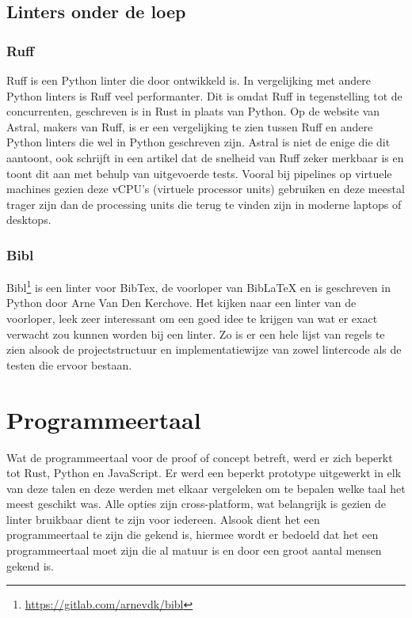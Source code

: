 \subsection{Linters onder de loep}
\subsubsection{Ruff}
Ruff is een Python linter die door \textcite{Astral2024} ontwikkeld is. In vergelijking met andere Python linters is Ruff veel performanter. Dit is omdat Ruff in tegenstelling tot de concurrenten, geschreven is in Rust in plaats van Python. Op de website van Astral, makers van Ruff, is er een vergelijking te zien tussen Ruff en andere Python linters die wel in Python geschreven zijn. Astral is niet de enige die dit aantoont, ook \textcite{TurnerTrauring2023} schrijft in een artikel dat de snelheid van Ruff zeker merkbaar is en toont dit aan met behulp van uitgevoerde tests. Vooral bij pipelines op virtuele machines gezien deze vCPU's (virtuele processor units) gebruiken en deze meestal trager zijn dan de processing units die terug te vinden zijn in moderne laptops of desktops.

\subsubsection{Bibl}
Bibl\footnote{\url{https://gitlab.com/arnevdk/bibl}} is een linter voor BibTex, de voorloper van BibLaTeX en is geschreven in Python door Arne Van Den Kerchove. Het kijken naar een linter van de voorloper, leek zeer interessant om een goed idee te krijgen van wat er exact verwacht zou kunnen worden bij een linter. Zo is er een hele lijst van regels te zien alsook de projectstructuur en implementatiewijze van zowel lintercode als de testen die ervoor bestaan.

\section{Programmeertaal}
Wat de programmeertaal voor de proof of concept betreft, werd er zich beperkt tot Rust, Python en JavaScript. Er werd een beperkt prototype uitgewerkt in elk van deze talen en deze werden met elkaar vergeleken om te bepalen welke taal het meest geschikt was. Alle opties zijn cross-platform, wat belangrijk is gezien de linter bruikbaar dient te zijn voor iedereen. Alsook dient het een programmeertaal te zijn die gekend is, hiermee wordt er bedoeld dat het een programmeertaal moet zijn die al matuur is en door een groot aantal mensen gekend is.

